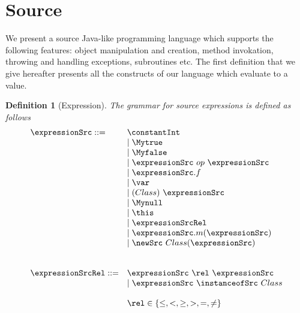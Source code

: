 
\newtheorem{Expression}{Definition}[section]
\newtheorem{ExpressionRel}[Expression]{Definition}
\newtheorem{Statement}[Expression]{Definition}

\section{Source} \label{source}


We present a source Java-like programming language which supports the following features:
object manipulation and creation, method invokation, throwing and handling exceptions, subroutines etc.  
The first definition that we give hereafter presents all the constructs of our language which evaluate
to a value.

\begin{Expression}[Expression]\label{exprSrc}
    The grammar for source expressions  is defined as follows
    $$ \begin{array} {ll}    \expressionSrc ::=       
       		         	& \constantInt  \\
				& \mid \Mytrue \\ 
				& \mid \Myfalse \\
				& \mid \expressionSrc \ op \ \expressionSrc \\  
				& \mid \expressionSrc.f \\
				& \mid \var \\
  			        & \mid (Class) \ \expressionSrc \\
                                & \mid \Mynull  \\
				& \mid \this \\
              	        	& \mid \expressionSrcRel \\
				& \mid \expressionSrc.m( \expressionSrc ) \\
				& \mid  \newSrc \ Class  ( \expressionSrc  ) \\ 
                                & \\
				& \\
        

     \expressionSrcRel ::=      & \expressionSrc \ \rel \ \expressionSrc \\
				& \mid \expressionSrc \ \instanceofSrc \ Class\\
				& \\   
				& \rel \in \{ \le, < ,  \ge, >, = , \neq \}                   
    \end{array} 
    $$
\end{Expression}


